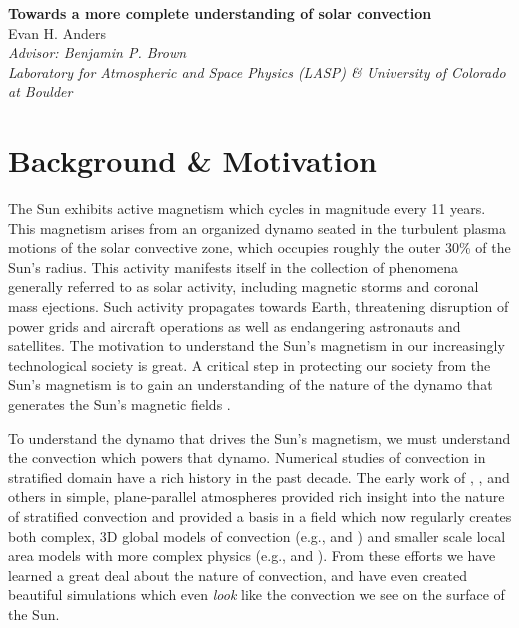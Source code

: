 \documentclass[aasms,12pt]{article}
\begin{document}
\begin{center}
   \large\textbf{Towards a more complete understanding of solar convection}\\
   \vspace{0.4cm}
   \large{Evan H. Anders}\\
   \vspace{0.4cm}
   \normalsize\textit{Advisor: Benjamin P. Brown}\\
   \normalsize\textit{Laboratory for Atmospheric and Space Physics (LASP) \& University of Colorado at Boulder}\\
\end{center}

\section{Background \& Motivation}
The Sun exhibits active magnetism which cycles in magnitude every 11 years.
This magnetism arises from an 
organized dynamo seated in the turbulent plasma
motions of the solar convective zone, which occupies roughly the outer 30\%
of the Sun's radius. This activity manifests itself in the collection of phenomena generally
referred to as solar activity, including magnetic storms and coronal mass
ejections.  Such activity propagates towards Earth, threatening disruption of 
power grids and aircraft operations as well as endangering astronauts and satellites.
The motivation to understand the Sun's magnetism in our increasingly technological society
is great.  A critical step in protecting our society from the Sun's magnetism is 
to gain an understanding of the nature of the dynamo that generates the Sun's magnetic fields
\citep{charbonneau2014}.

To understand the dynamo that drives the Sun's magnetism, we must understand the convection
which powers that dynamo.  Numerical studies of convection in stratified domain have a
rich history in the past decade.  The early work of \cite{graham1975}, \cite{hurlburt&all1984},
and others in simple, plane-parallel atmospheres
provided rich insight into the nature of stratified convection and provided a basis
in a field which now regularly creates both complex, 3D global models of convection
(e.g., \cite{brown&all2010} and \cite{guerrero&all2016})
and smaller scale local area models with more complex physics 
(e.g., \cite{stein&nordlund2012} and \cite{rempel2014}).
From these efforts we have learned a great deal about the nature of convection, and have
even created beautiful simulations which even \emph{look} like the convection we see on the
surface of the Sun.
\end{document}
